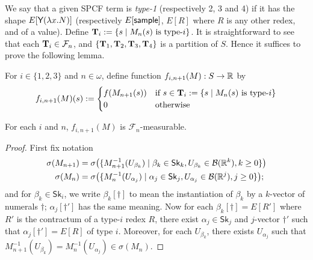 We say that a given SPCF term is \emph{type-1} (respectively 2, 3 and 4) if it has the shape $E[\textsf{Y} (\lambda x. N)]$ (respectively $E[\textsf{sample}]$, $E[R]$ where $R$ is any other redex, and of a value).
Define $\mathbf{T}_i := 
\{s \mid M_n(s) \hbox{ is type-$i$}\}$.
It is straightforward to see that each $\mathbf{T}_i \in \mathcal{F}_n$, and $\{\mathbf{T}_1, \mathbf{T}_2, \mathbf{T}_3, \mathbf{T}_4\}$ is a partition of $S$.
Hence it suffices to prove the following lemma.

\iffalse
For $i \in \{1, 2, 3\}$ and $n \in \omega$, define function $f_{i, n+1}(M) : S \to \mathbb{R}$ by
\[
f_{i, n+1}(M)(s) :=
\begin{cases}
f(M_{n+1}(s)) & \hbox{if }s \in \mathbf{T}_i := 
\{s \mid M_n(s) \textrm{ is type-$i$}\}\\
0 & \textrm{otherwise}
\end{cases}
\]
\begin{lemma}
\label{lem:inde}
For each $i$ and $n$, $f_{i, n+1}(M)$ is %
$\mathcal{F}_{n}$-measurable.
\end{lemma}

\begin{proof} First fix notation
\begin{align*}
\sigma(M_{n+1}) &= \sigma\big(\{M_{n+1}^{-1}(U_{\beta_k})
\mid \beta_k\in \mathsf{Sk}_k, U_{\beta_k} \in \mathcal{B}(\mathbb{R}^k), k \geq 0\}\big)\\
\sigma(M_{n}) &= \sigma\big(\{M_{n}^{-1}(U_{\alpha_j})
\mid \alpha_j\in \mathsf{Sk}_j, U_{\alpha_j} \in \mathcal{B}(\mathbb{R}^j), j \geq 0\}\big);
\end{align*}
and for $\beta_k \in \mathsf{Sk}_i$, we write $\beta_k[\dagger]$ to mean the instantiation of $\beta_k$ by a $k$-vector of numerals $\dagger$; $\alpha_j[\dagger']$ has the same meaning.
Now for each $\beta_k[\dagger] = E[R']$ where $R'$ is the contractum of a type-$i$ redex $R$, there exist $\alpha_j \in \mathsf{Sk}_j$ and $j$-vector $\dagger'$ such that $\alpha_j[\dagger'] = E[R]$ of type $i$.
Moreover, for each $U_{\beta_k}$, there exists $U_{\alpha_j}$ such that $M_{n+1}^{-1}(U_{\beta_k}) = M_{n}^{-1}(U_{\alpha_j}) \in \sigma(M_n)$.
\end{proof}

